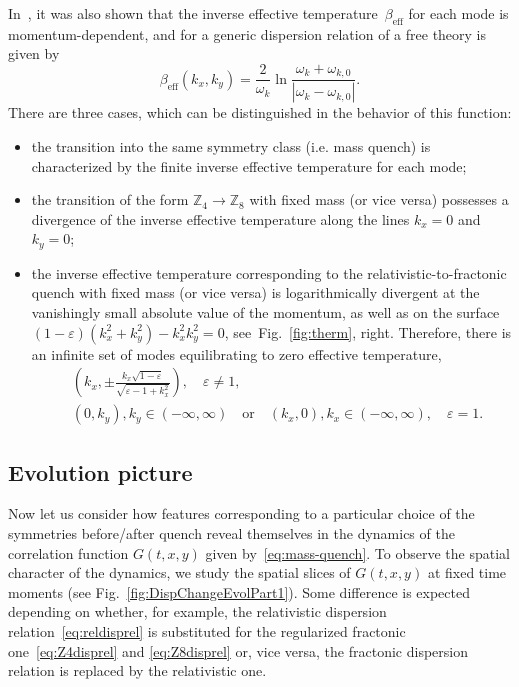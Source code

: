 \documentclass[a4paper,12pt]{article}
\newcommand{\be}{\begin{equation}}
\newcommand{\ee}{\end{equation}}
\newcommand{\eps}{\varepsilon}
\newcommand{\om}{\omega}
\newcommand{\Z}[1]{\mathbb{Z}_{#1}}
\newcommand{\figref}[1]{Fig.~\ref{#1}}
\begin{document}
In~\cite{Calabrese:2007rg}, it was also shown that the inverse effective temperature~$\beta_\text{eff}$ for each mode is momentum-dependent, and for a generic dispersion relation of a free theory is given by
\be
    \beta_\text{eff}(k_x, k_y) = \frac{2}{\om_k}\ln\frac{\om_k + \om_{k,0}}{|\om_k - \om_{k,0}|}.
    \label{eq:EffTemp}
\ee
There are three cases, which can be distinguished in the behavior of this function:
\begin{itemize}
    \item the transition into the same symmetry class (i.e. mass quench) is characterized by the finite inverse effective temperature for each mode;
    
    \item the transition of the form $\Z4 \to \Z8$ with fixed mass (or vice versa) possesses a divergence of the inverse effective temperature along the lines $k_x = 0$ and $k_y = 0$;
    
    \item the inverse effective temperature corresponding to the relativistic-to-fractonic quench with fixed mass (or vice versa) is logarithmically divergent at the vanishingly small absolute value of the momentum, as well as on the surface $(1 - \eps)(k_x^2 + k_y^2) - k_x^2k_y^2 = 0$, see~\figref{fig:therm}, right. Therefore, there is an infinite set of modes equilibrating to zero effective temperature,
        \be
            \begin{aligned}
                & \left(k_x, \pm\frac{k_x\sqrt{1 - \eps}}{\sqrt{\eps - 1 + k_x^2}}\right), \quad \eps \neq 1, \\
                & \left(0, k_y\right), k_y \in (-\infty, \infty) \quad\text{or}\quad \left(k_x, 0\right), k_x \in (-\infty, \infty), \quad \eps = 1.
            \end{aligned}
        \ee
\end{itemize}

\subsection*{Evolution picture}

Now let us consider how features corresponding to a particular choice of the symmetries before/after quench reveal themselves in the dynamics of the correlation function $G(t, x, y)$ given by~\eqref{eq:mass-quench}. To observe the spatial character of the dynamics, we study the spatial slices of $G(t, x, y)$ at fixed time moments (see \figref{fig:DispChangeEvolPart1}). Some difference is expected depending on whether, for example, the relativistic dispersion relation~\eqref{eq:reldisprel} is substituted for the regularized fractonic one~\eqref{eq:Z4disprel} and \eqref{eq:Z8disprel} or, vice versa, the fractonic dispersion relation is replaced by the relativistic one.
\end{document}
